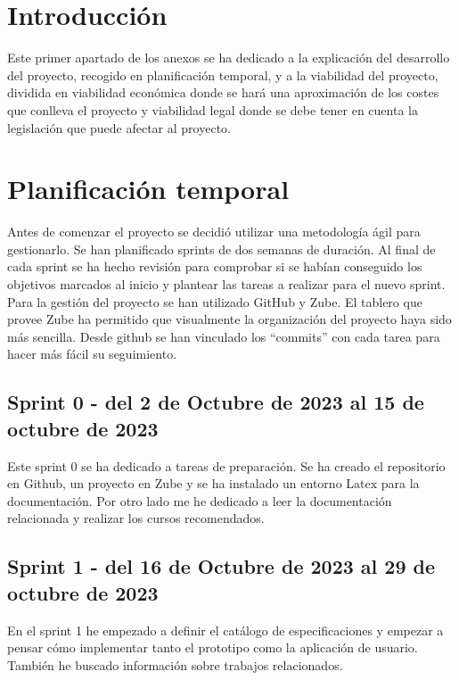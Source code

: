 
\section{Introducción}
Este primer apartado de los anexos se ha dedicado a la explicación del
desarrollo del proyecto, recogido en planificación temporal, y a la viabilidad
del proyecto, dividida en viabilidad económica donde se hará una aproximación de los costes que conlleva el proyecto y viabilidad legal donde se debe
tener en cuenta la legislación que puede afectar al proyecto.

\section{Planificación temporal}
Antes de comenzar el proyecto se decidió utilizar una metodología ágil para
gestionarlo. Se han planificado sprints de dos semanas de duración.
Al final de cada sprint se ha hecho revisión para comprobar si se habían
conseguido los objetivos marcados al inicio y plantear las tareas a
realizar para el nuevo sprint.
Para la gestión del proyecto se han utilizado GitHub y Zube. El
tablero que provee Zube ha permitido que visualmente la organización
del proyecto haya sido más sencilla. Desde github se han vinculado los ``commits'' 
con cada tarea para hacer más fácil su seguimiento.

\subsection{Sprint 0 - del 2 de Octubre de 2023 al 15 de octubre de 2023}
Este sprint 0 se ha dedicado a tareas de preparación.
Se ha creado el repositorio en Github, un proyecto en Zube y se ha instalado 
un entorno Latex para la documentación.
Por otro lado me he dedicado a leer la documentación relacionada y 
realizar los cursos recomendados.
\subsection{Sprint 1 - del 16 de Octubre de 2023 al 29 de octubre de 2023}
En el sprint 1 he empezado a definir el catálogo de especificaciones y empezar a 
pensar cómo implementar tanto el prototipo como la aplicación de usuario.
También he buscado información sobre trabajos relacionados.
